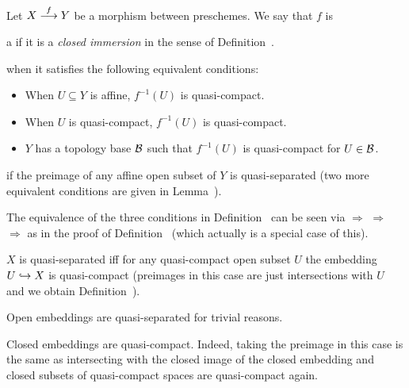 \documentclass[a4paper,parskip=half,numbers=enddot, DIV=12]{scrreprt}
\begin{document}
\begin{defi}
    Let $X\morphism[f] Y$ be a morphism between preschemes. We say that $f$ is
    \begin{alphanumerate}
        \item
            a  if it is a \emph{closed immersion} in the sense of Definition~.
        \item 
             when it satisfies the following equivalent conditions:
            \begin{itemize}
              \item[\itememph{\alpha}]
                When $U\subseteq Y$ is affine, $f^{-1}(U)$ is quasi-compact.
              \item[\itememph{\beta}]
                When $U$ is quasi-compact, $f^{-1}(U)$ is quasi-compact.
              \item[\itememph{\gamma}]
                $Y$ has a topology base $\mathcal{B}$ such that $f^{-1}(U)$ is quasi-compact for $U\in \mathcal{B}$.
            \end{itemize}
        \item 
             if the preimage of any affine open subset of $Y$ is quasi-separated (two more equivalent conditions are given in Lemma~).
    \end{alphanumerate}
\end{defi}
\begin{rem}
    \begin{alphanumerate}
        \item {}
            The equivalence of the three conditions in Definition~ can be seen via \itememph{\beta} $\Rightarrow$ \itememph{\alpha} $\Rightarrow$ \itememph{\gamma} $\Rightarrow$ \itememph{\beta} as in the proof of Definition~ (which actually is a special case of this). 
        \item 
            $X$ is quasi-separated iff for any quasi-compact open subset $U$ the embedding $U\monomorphism X$ is quasi-compact (preimages in this case are just intersections with $U$ and we obtain Definition~).
        \item 
            Open embeddings are quasi-separated for trivial reasons.
        \item
	        Closed embeddings are quasi-compact. Indeed, taking the preimage in this case is the same as intersecting with the closed image of the closed embedding and closed subsets of quasi-compact spaces are quasi-compact again.
    \end{alphanumerate}
\end{rem}
\end{document}
